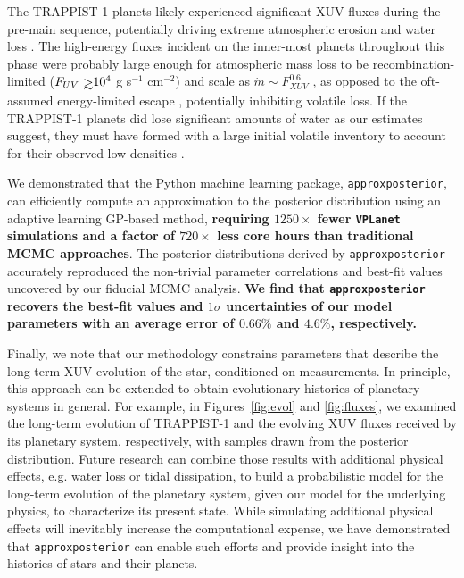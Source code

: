 \documentclass[twocolumn]{aastex62}
\def\gsim{~\rlap{$>$}{\lower 1.0ex\hbox{$\sim$}}}
\newcommand{\xxx}[1]{{\textbf{#1}}}
\newcommand{\vplanet}[0]{\texttt{VPLanet}\xspace}
\newcommand{\approxposterior}[0]{\texttt{approxposterior}\xspace}
\begin{document}
The TRAPPIST-1 planets likely experienced significant XUV fluxes during the pre-main sequence, potentially driving extreme atmospheric erosion and water loss \citep{Bolmont2017,Bourrier2017a}. The high-energy fluxes incident on the inner-most planets throughout this phase were probably large enough for atmospheric mass loss to be recombination-limited ($F_{UV} \gsim 10^4$ g s$^{-1}$ cm$^{-2}$) and scale as $\dot{m} \sim F_{XUV}^{0.6}$ \citep{MurrayClay2009}, as opposed to the oft-assumed energy-limited escape \citep[$\dot{m} \sim F_{XUV}$,][]{Watson1981,Lammer2003}, potentially inhibiting volatile loss. If the TRAPPIST-1 planets did lose significant amounts of water as our estimates suggest, they must have formed with a large initial volatile inventory to account for their observed low densities \citep{Grimm2018}.

We demonstrated that the Python machine learning package, \approxposterior \citep{FlemingVanderPlas2018}, can efficiently compute an approximation to the posterior distribution using an adaptive learning GP-based method, \xxx{requiring $1250\times$ fewer \vplanet simulations and a factor of $720\times$ less core hours than traditional MCMC approaches}. The posterior distributions derived by \approxposterior accurately reproduced the non-trivial parameter correlations and best-fit values uncovered by our fiducial MCMC analysis. \xxx{We find that \approxposterior recovers the best-fit values and $1\sigma$ uncertainties of our model parameters with an average error of $0.66\%$ and $4.6\%$, respectively.}  

Finally, we note that our methodology constrains parameters that describe the long-term XUV evolution of the star, conditioned on measurements. In principle, this approach can be extended to obtain evolutionary histories of planetary systems in general.  For example, in Figures~\ref{fig:evol} and \ref{fig:fluxes}, we examined the long-term evolution of TRAPPIST-1 and the evolving XUV fluxes received by its planetary system, respectively, with samples drawn from the posterior distribution. Future research can combine those results with additional physical effects, e.g. water loss or tidal dissipation, to build a probabilistic model for the long-term evolution of the planetary system, given our model for the underlying physics, to characterize its present state. While simulating additional physical effects will inevitably increase the computational expense, we have demonstrated that \approxposterior can enable such efforts and provide insight into the histories of stars and their planets.
\end{document}
